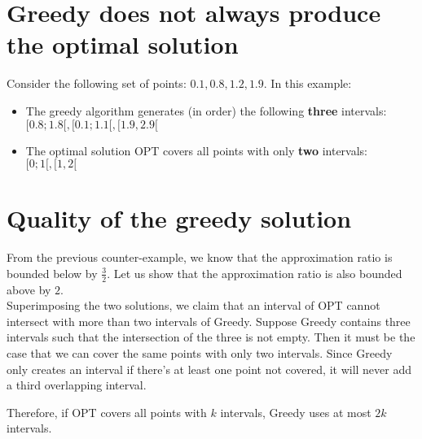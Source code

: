 
\section{Greedy does not always produce the optimal solution}

Consider the following set of points: ${0.1, 0.8, 1.2, 1.9}$. In this example:
\begin{itemize}
  \item The greedy algorithm generates (in order) the following \textbf{three} intervals: $[0.8; 1.8[, [0.1; 1.1[, [1.9, 2.9[$
  \item The optimal solution OPT covers all points with only \textbf{two} intervals: $[0; 1[, [1, 2[$
\end{itemize}

\section{Quality of the greedy solution}

From the previous counter-example, we know that the approximation ratio is bounded below by $\frac{3}{2}$. Let us show that the approximation ratio is also bounded above by $2$.\\

Superimposing the two solutions, we claim that an interval of OPT cannot intersect with more than two intervals of Greedy. Suppose Greedy contains three intervals such that the intersection of the three is not empty. Then it must be the case that we can cover the same points with only two intervals. Since Greedy only creates an interval if there's at least one point not covered, it will never add a third overlapping interval.

Therefore, if OPT covers all points with $k$ intervals, Greedy uses at most $2k$ intervals.

